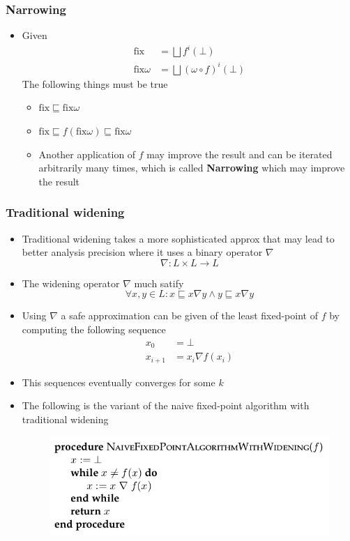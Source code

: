 \subsubsection{Narrowing}
\begin{itemize}
  \item Given
  \begin{align*}
    \text{fix} &= \bigsqcup f^i(\bot) \\
    \text{fix}\omega &= \bigsqcup (\omega \circ f) ^i(\bot)
  \end{align*}
The following things must be true
  \begin{itemize}
    \item $\text{fix} \sqsubseteq \text{fix}\omega$
    \item $\text{fix} \sqsubseteq f(\text{fix} \omega) \sqsubseteq \text{fix}\omega$ 
    \item Another application of $f$ may improve the result and can be iterated arbitrarily many times, which is called \textbf{Narrowing} which may improve the result
  \end{itemize}
\end{itemize}

\subsubsection{Traditional widening}
\begin{itemize}
  \item Traditional widening takes a more sophisticated approx that may lead to better analysis precision where it uses a binary operator $\nabla$
  \begin{equation*}
    \nabla : L \times L \to L
  \end{equation*}
  \item The widening operator $\nabla$ much satify
  \begin{equation*}
    \forall x,y \in L: x \sqsubseteq x \nabla y \land y \sqsubseteq x \nabla y
  \end{equation*}
  \item Using $\nabla$ a safe approximation can be given of the least fixed-point of $f$ by computing the following sequence
  \begin{align*}
    x_0 &= \bot\\
    x_{i+1} &= x_i \nabla f(x_i)
  \end{align*}
  \item This sequences eventually converges for some $k$
  \item The following is the variant of the naive fixed-point algorithm with traditional widening
  \begin{figure}[H]
  	\centering
  	\includegraphics[width=300pt]{img/monotone/naive_widening}
  \end{figure}
\end{itemize}

